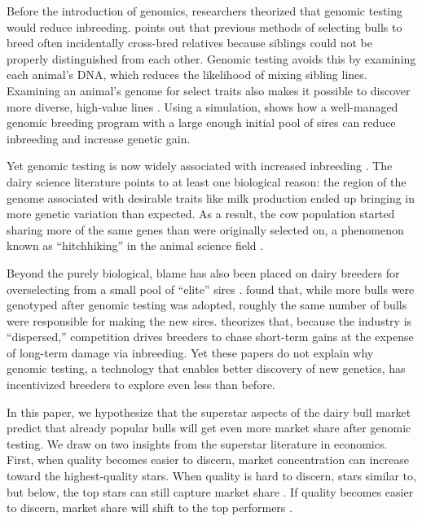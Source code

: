 \documentclass[12pt,letterpaper]{article}
\begin{document}
Before the introduction of genomics, researchers theorized that genomic testing would reduce inbreeding. \citet{Daetwyler2007} points out that previous methods of selecting bulls to breed often incidentally cross-bred relatives because siblings could not be properly distinguished from each other. Genomic testing avoids this by examining each animal's DNA, which reduces the likelihood of mixing sibling lines. Examining an animal's genome for select traits also makes it possible to discover more diverse, high-value lines \citep{howard_invited_2017,scott_how_2021}. Using a simulation, \citet{de2011effects} shows how a well-managed genomic breeding program with a large enough initial pool of sires can reduce inbreeding and increase genetic gain.

Yet genomic testing is now widely associated with increased inbreeding \citep{makanjuola_effect_2020,scott_how_2021}. The dairy science literature points to at least one biological reason: the region of the genome associated with desirable traits like milk production ended up bringing in more genetic variation than expected. As a result, the cow population started sharing more of the same genes than were originally selected on, a phenomenon known as ``hitchhiking'' in the animal science field \citep{makanjuola_effect_2020}.

Beyond the purely biological, blame has also been placed on dairy breeders for overselecting from a small pool of ``elite'' sires \citep{howard_invited_2017,scott_how_2021,Cole2023}.
\citet{miglior_genetic_2014} found that, while more bulls were genotyped after genomic testing was adopted, roughly the same number of bulls were responsible for making the new sires. \citet{howard_invited_2017} theorizes that, because the industry is ``dispersed,'' competition drives breeders to chase short-term gains at the expense of long-term damage via inbreeding. Yet these papers do not explain why genomic testing, a technology that enables better discovery of new genetics, has incentivized breeders to explore even less than before.

In this paper, we hypothesize that the superstar aspects of the dairy bull market predict that already popular bulls will get even more market share after genomic testing. We draw on two insights from the superstar literature in economics. First, when quality becomes easier to discern, market concentration can increase toward the highest-quality stars. When quality is hard to discern, stars similar to, but below, the top stars can still capture market share \citep{rosen_economics_1981}. If quality becomes easier to discern, market share will shift to the top performers \citep{macdonald_economics_1988}.
\end{document}

